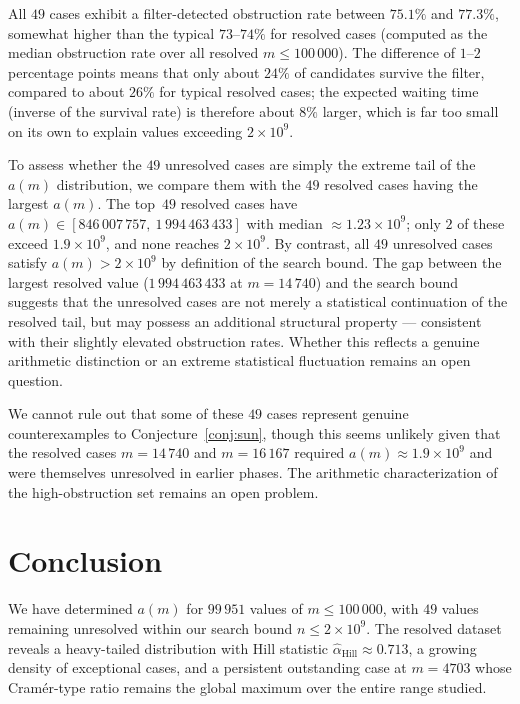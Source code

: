 \documentclass[12pt]{article}
\begin{document}
All $49$ cases exhibit a filter-detected obstruction rate between
$75.1\%$ and $77.3\%$, somewhat higher than the typical $73$--$74\%$
for resolved cases (computed as the median obstruction rate over all
resolved $m \leq 100\,000$).
The difference of $1$--$2$ percentage points means that only about
$24\%$ of candidates survive the filter, compared to about $26\%$ for
typical resolved cases; the expected waiting time (inverse of the
survival rate) is therefore about $8\%$ larger, which is far too small
on its own to explain values exceeding $2 \times 10^9$.

To assess whether the $49$ unresolved cases are simply the extreme
tail of the $a(m)$ distribution, we compare them with the $49$
resolved cases having the largest $a(m)$.
The top~$49$ resolved cases have
$a(m) \in [846\,007\,757,\ 1\,994\,463\,433]$ with median
$\approx 1.23 \times 10^9$; only $2$ of these exceed
$1.9 \times 10^9$, and none reaches $2 \times 10^9$.
By contrast, all $49$ unresolved cases satisfy $a(m) > 2 \times 10^9$
by definition of the search bound.
The gap between the largest resolved value ($1\,994\,463\,433$ at $m = 14\,740$)
and the search bound suggests that the unresolved cases are not merely
a statistical continuation of the resolved tail, but may possess an
additional structural property --- consistent with their slightly
elevated obstruction rates.
Whether this reflects a genuine arithmetic distinction or an extreme
statistical fluctuation remains an open question.

We cannot rule out that some of these $49$ cases represent genuine
counterexamples to Conjecture~\ref{conj:sun}, though this seems
unlikely given that the resolved cases $m = 14\,740$ and $m = 16\,167$
required $a(m) \approx 1.9 \times 10^9$ and were themselves unresolved
in earlier phases.
The arithmetic characterization of the high-obstruction set remains an
open problem.

\section{Conclusion}

We have determined $a(m)$ for $99\,951$ values of $m \leq 100\,000$,
with $49$ values remaining unresolved within our search bound
$n \leq 2 \times 10^9$.
The resolved dataset reveals a heavy-tailed distribution with Hill
statistic $\hat{\alpha}_{\mathrm{Hill}} \approx 0.713$, a growing
density of exceptional cases, and a persistent outstanding case at
$m = 4703$ whose Cram\'er-type ratio remains the global maximum over
the entire range studied.
\end{document}
